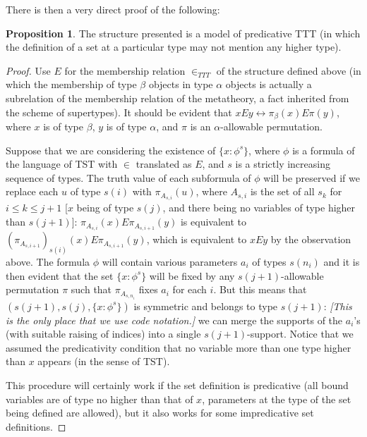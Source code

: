 \documentclass[112pt]{article}
\theoremstyle{definition}
\newtheorem{proposition}[theorem]{Proposition}
\theoremstyle{remark}
\newcommand{\rk}[1]{{\color{blue}\sl #1}}
\begin{document}
{There is then a very direct proof of the following:}
\begin{proposition}\label{prop:predicative_ttt}
  The structure presented is a model of predicative TTT (in which the definition of a set at a particular type may not mention any higher type).
\end{proposition}
\begin{proof}
Use $E$ for the membership relation $\in_{TTT}$ of the structure defined above (in which the membership of type $\beta$ objects in type $\alpha$ objects is actually a subrelation of the membership relation of the metatheory, a fact inherited from the scheme of supertypes).  It should be evident that $x E y \leftrightarrow \pi_\beta(x) E \pi(y)$,
where $x$ is of type $\beta$, $y$ is of type $\alpha$, and $\pi$ is an $\alpha$-allowable permutation.

Suppose that we are considering the existence of $\{x : \phi^s\}$, where $\phi$ is a formula of the language of TST with $\in$ translated as $E$, and $s$ is a strictly increasing sequence of types.  The truth value of each subformula of $\phi$ will be preserved if we replace each $u$ of type $s(i)$ with $\pi_{A_{s,i}}(u)$, where  $A_{s,i}$ is the set of all $s_k$ for $i \leq k \leq j+1$ [$x$ being of type $s(j)$, and there being no variables of type higher than $s(j+1)$]:  $\pi_{A_{s,i}}(x) E  \pi_{A_{s,i+1}}(y)$ is equivalent to $(\pi_{A_{s,i+1}})_{s(i)}(x) E \pi_{A_{s,i+1}}(y)$, which is equivalent to $xEy$ by the observation above. The formula $\phi$ will contain various parameters $a_i$ of types $s(n_i)$ and it is then evident that the set $\{x : \phi^s\}$ will be fixed by any $s(j+1)$-allowable permutation $\pi$ such that $\pi_{A_{s,n_i}}$ fixes $a_i$ for each $i$.  But this means that
$(s(j+1),s(j),\{x : \phi^s\})$ is symmetric and belongs to type $s(j+1)$: \rk{[This is the only place that we use code notation.]}  we can merge the supports of the $a_i$'s (with suitable raising of indices) into a single $s(j+1)$-support.  Notice that we assumed the predicativity condition that no variable more than one type higher than $x$ appears (in the sense of TST).

This procedure will certainly work if the set definition is predicative (all bound variables are of type no higher than that of $x$, parameters at the type
of the set being defined are allowed), but it also works for some impredicative set definitions.
\end{proof}
\end{document}
